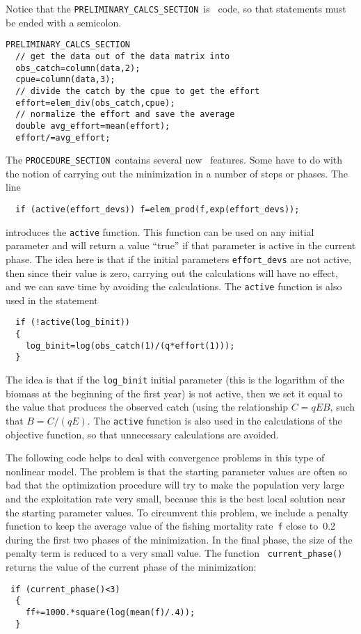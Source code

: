 \documentclass{admbmanual}
\newcommand\PCS{\texttt{PRELIMINARY\_CALCS\_SECTION}}
\newcommand\PROS{\texttt{PROCEDURE\_SECTION}}
\begin{document}
Notice that the \PCS\ is \cplus\ code, so that statements must be ended
with a semicolon.
\begin{lstlisting}
PRELIMINARY_CALCS_SECTION
  // get the data out of the data matrix into
  obs_catch=column(data,2);
  cpue=column(data,3);
  // divide the catch by the cpue to get the effort
  effort=elem_div(obs_catch,cpue);
  // normalize the effort and save the average
  double avg_effort=mean(effort);
  effort/=avg_effort;
\end{lstlisting}
The \PROS\ contains several new \ADM\ features. Some have to do with the notion
of carrying out the minimization in a number of steps or phases. The line
\begin{lstlisting}
  if (active(effort_devs)) f=elem_prod(f,exp(effort_devs));
\end{lstlisting}
introduces the \texttt{active} function. This function can be used on any
initial parameter and will return a value ``true'' if that parameter is active
in the current phase. The idea here is that if the initial parameters
\texttt{effort\_devs} are not active, then since their value is zero, carrying
out the calculations will have no effect, and we can save time by avoiding the
calculations. The \texttt{active} function is also used in the statement
\begin{lstlisting}
  if (!active(log_binit))
  {
    log_binit=log(obs_catch(1)/(q*effort(1)));
  }
\end{lstlisting}
The idea is that if the \texttt{log\_binit} initial parameter (this is the
logarithm of the biomass at the beginning of the first year) is not active, then
we set it equal to the value that produces the observed catch (using the
relationship $C=qEB$, such that $B=C/(qE)$. The \texttt{active} function is also
used in the calculations of the objective function, so that unnecessary
calculations are avoided.

The following code helps to deal with convergence problems in this type of
nonlinear model. The problem is that the starting parameter values are often so
bad that the optimization procedure will try to make the population very large
and the exploitation rate very small, because this is the best local solution
near the starting parameter values. To circumvent this problem, we include a
penalty function to keep the average value of the fishing mortality
rate~\texttt{f} close to~0.2 during the first two phases of the minimization. In
the final phase, the size of the penalty term is reduced to a very small value.
The function \texttt{ current\_phase()} returns the value of the current phase
of the minimization:
\begin{lstlisting}
 if (current_phase()<3)
  {
    ff+=1000.*square(log(mean(f)/.4));
  }
\end{lstlisting}
\end{document}
